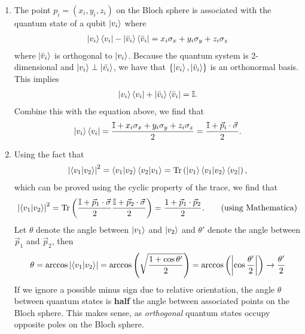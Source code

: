 \documentclass{article}
\theoremstyle{definition}
\newcommand{\f}[2]{\frac{#1}{#2}}
\newcommand{\lp}{\left(}
\newcommand{\rp}{\right)}
\begin{document}
\begin{enumerate}[label=(\alph*)]
	\item The point $p_i = (x_i,y_i,z_i)$ on the Bloch sphere is associated with the quantum state of a qubit $\ket{v_i}$ where
	\begin{align*}
		\ket{v_i}\bra{v_i} - \ket{\bar{v}_i} \bra{\bar{v}_i} = x_i \sigma_x + y_i \sigma_y + z_i \sigma_z
	\end{align*}
	where $\ket{\bar{v}_i}$ is orthogonal to $\ket{v_i}$. Because the quantum system is 2-dimensional and $\ket{v_i}\perp \ket{\bar{v_i}}$, we have that $\{ \ket{v_i}, \ket{\bar{v}_i} \}$ is an orthonormal basis. This implies
	\begin{align*}
		\ket{v_i}\bra{v_i} + \ket{\bar{v}_i}\bra{\bar{v}_i} = \mathbb{I}.
	\end{align*}
	Combine this with the equation above, we find that
	\begin{align*}
		\ket{v_i} \bra{v_i} = \f{\mathbb{I} + x_i \sigma_x + y_i \sigma_y + z_i \sigma_z }{2} = \f{\mathbb{I} + \vec{p}_i\cdot \vec{\sigma}}{2}.
	\end{align*}



	\item Using the fact that
	\begin{align*}
		\abs{\bra{v_1}\ket{v_2}}^2 = \bra{v_1}\ket{v_2} \bra{v_2}\ket{v_1} = \Tr\lp \ket{v_1} \bra{v_1}   \ket{v_2} \bra{v_2}  \rp,
	\end{align*}
	which can be proved using the cyclic property of the trace, we find that
	\begin{align*}
			\abs{\bra{v_1}\ket{v_2}}^2 = \Tr\lp  \f{\mathbb{I} + \vec{p}_1\cdot \vec{\sigma}}{2} \f{\mathbb{I} + \vec{p}_2\cdot \vec{\sigma}}{2}  \rp = \f{1+\vec{p}_1 \cdot \vec{p}_2}{2}. \quad\quad \text{(using Mathematica)}
	\end{align*}
	Let $\theta$ denote the angle between $\ket{v_1}$ and $\ket{v_2}$ and $\theta'$ denote the angle between $\vec{p}_1$ and $\vec{p}_2$, then 
	\begin{align*}
		\theta = \arccos \abs{\bra{v_1}\ket{v_2}} = \arccos \lp \sqrt{ \f{1 + \cos\theta'}{2} } \rp = \arccos \lp \abs{\cos\f{\theta'}{2}} \rp \to \f{\theta'}{2}
	\end{align*}
	If we ignore a possible minus sign due to relative orientation, the angle $\theta$ between quantum states is \textbf{half} the angle between associated points on the Bloch sphere. This makes sense, as \textit{orthogonal} quantum states occupy opposite poles on the Bloch sphere. \\
	

\end{enumerate}
\end{document}
